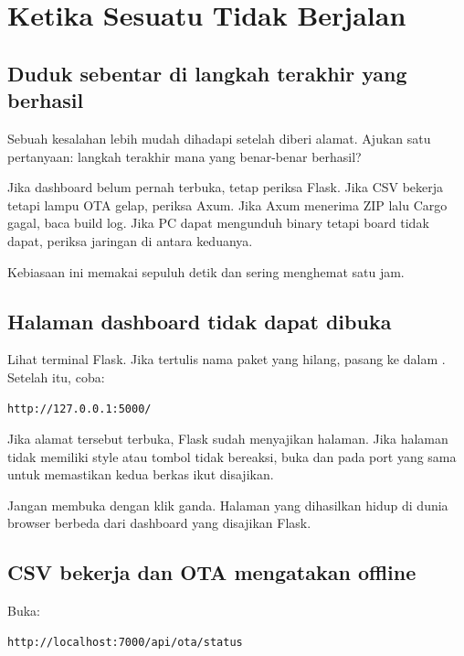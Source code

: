 \chapter{Ketika Sesuatu Tidak Berjalan}

\section{Duduk sebentar di langkah terakhir yang berhasil}

Sebuah kesalahan lebih mudah dihadapi setelah diberi alamat. Ajukan satu pertanyaan: langkah terakhir mana yang benar-benar berhasil?

Jika dashboard belum pernah terbuka, tetap periksa Flask. Jika CSV bekerja tetapi lampu OTA gelap, periksa Axum. Jika Axum menerima ZIP lalu Cargo gagal, baca build log. Jika PC dapat mengunduh binary tetapi board tidak dapat, periksa jaringan di antara keduanya.

Kebiasaan ini memakai sepuluh detik dan sering menghemat satu jam.

\section{Halaman dashboard tidak dapat dibuka}

Lihat terminal Flask. Jika tertulis nama paket yang hilang, pasang  ke dalam . Setelah itu, coba:

\begin{lstlisting}[numbers=none]
http://127.0.0.1:5000/
\end{lstlisting}

Jika alamat tersebut terbuka, Flask sudah menyajikan halaman. Jika halaman tidak memiliki style atau tombol tidak bereaksi, buka  dan  pada port yang sama untuk memastikan kedua berkas ikut disajikan.

Jangan membuka  dengan klik ganda. Halaman  yang dihasilkan hidup di dunia browser berbeda dari dashboard yang disajikan Flask.

\section{CSV bekerja dan OTA mengatakan offline}

Buka:

\begin{lstlisting}[numbers=none]
http://localhost:7000/api/ota/status
\end{lstlisting}

